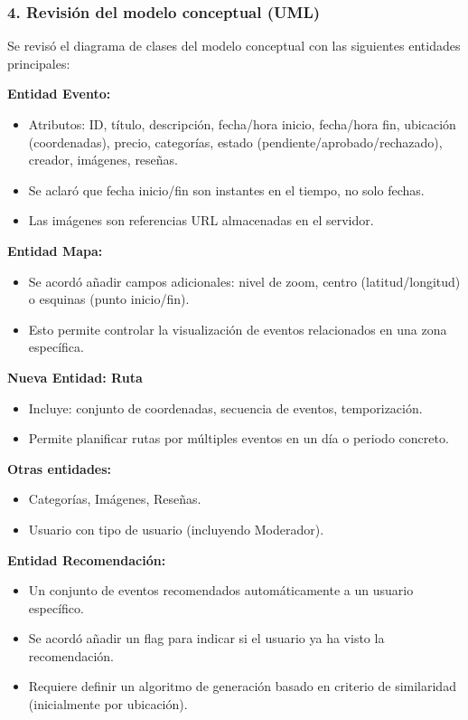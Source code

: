 \subsubsection*{4. Revisión del modelo conceptual (UML)}
Se revisó el diagrama de clases del modelo conceptual con las siguientes entidades principales:

\textbf{Entidad Evento:}
\begin{itemize}
    \item Atributos: ID, título, descripción, fecha/hora inicio, fecha/hora fin, ubicación (coordenadas), precio, categorías, estado (pendiente/aprobado/rechazado), creador, imágenes, reseñas.
    \item Se aclaró que fecha inicio/fin son instantes en el tiempo, no solo fechas.
    \item Las imágenes son referencias URL almacenadas en el servidor.
\end{itemize}

\textbf{Entidad Mapa:}
\begin{itemize}
    \item Se acordó añadir campos adicionales: nivel de zoom, centro (latitud/longitud) o esquinas (punto inicio/fin).
    \item Esto permite controlar la visualización de eventos relacionados en una zona específica.
\end{itemize}

\textbf{Nueva Entidad: Ruta}
\begin{itemize}
    \item Incluye: conjunto de coordenadas, secuencia de eventos, temporización.
    \item Permite planificar rutas por múltiples eventos en un día o periodo concreto.
\end{itemize}

\textbf{Otras entidades:}
\begin{itemize}
    \item Categorías, Imágenes, Reseñas.
    \item Usuario con tipo de usuario (incluyendo Moderador).
\end{itemize}

\textbf{Entidad Recomendación:}
\begin{itemize}
    \item Un conjunto de eventos recomendados automáticamente a un usuario específico.
    \item Se acordó añadir un flag para indicar si el usuario ya ha visto la recomendación.
    \item Requiere definir un algoritmo de generación basado en criterio de similaridad (inicialmente por ubicación).
\end{itemize}

